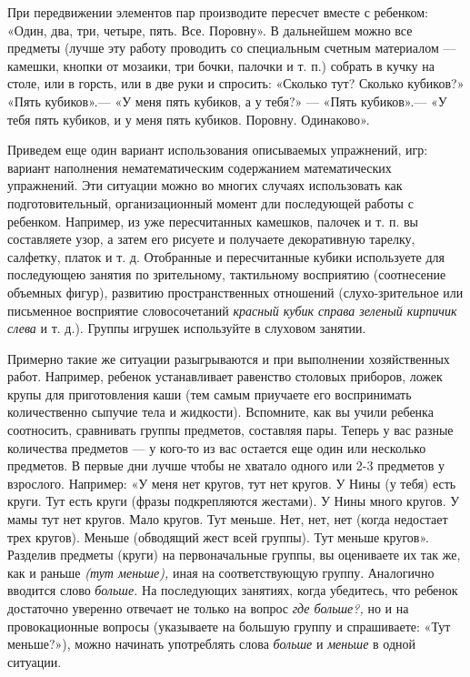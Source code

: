 \documentclass{book}
\renewcommand{\emph}[1]{\textit{#1}}
\begin{document}
При передвижении элементов пар производите пересчет вместе с ребенком:
«Один, два, три, четыре, пять. Все. Поровну». В дальнейшем можно все
предметы (лучше эту работу проводить со специальным счетным материалом
--- камешки, кнопки от мозаики, три бочки, палочки и т. п.) собрать в
кучку на столе, или в горсть, или в две руки и спросить: «Сколько тут?
Сколько кубиков?» «Пять кубиков».--- «У меня пять кубиков, а у тебя?»
--- «Пять кубиков».--- «У тебя пять кубиков, и у меня пять кубиков.
Поровну. Одинаково».

Приведем еще один вариант использования описываемых упражнений, игр:
вариант наполнения нематематическим содержанием математических
упражнений. Эти ситуации можно во многих случаях использовать как
подготовительный, организационный момент дли последующей работы с
ребенком. Например, из уже пересчитанных камешков, палочек и т. п. вы
составляете узор, а затем его рисуете и получаете декоративную тарелку,
салфетку, платок и т. д. Отобранные и пересчитанные кубики используете
для последующею занятия по зрительному, тактильному восприятию
(соотнесение объемных фигур), развитию пространственных отношений
(слухо-зрительное или письменное восприятие словосочетаний \emph{красный
кубик справа зеленый кирпичик слева} и т. д.). Группы игрушек
используйте в слуховом занятии.

Примерно такие же ситуации разыгрываются и при выполнении хозяйственных
работ. Например, ребенок устанавливает равенство столовых приборов,
ложек крупы для приготовления каши (тем самым приучаете его воспринимать
количественно сыпучие тела и жидкости). Вспомните, как вы учили ребенка
соотносить, сравнивать группы предметов, составляя пары. Теперь у вас
разные количества предметов --- у кого-то из вас остается еще один или
несколько предметов. В первые дни лучше чтобы не хватало одного или 2-3
предметов у взрослого. Например: «У меня нет кругов, тут нет кругов. У
Нины (у тебя) есть круги. Тут есть круги (фразы подкрепляются жестами).
У Нины много кругов. У мамы тут нет кругов. Мало кругов. Тут меньше.
Нет, нет, нет (когда недостает трех кругов). Меньше (обводящий жест всей
группы). Тут меньше кругов». Разделив предметы (круги) на первоначальные
группы, вы оцениваете их так же, как и раньше \emph{(тут меньше),} иная
на соответствующую группу. Аналогично вводится слово \emph{больше.} На
последующих занятиях, когда убедитесь, что ребенок достаточно уверенно
отвечает не только на вопрос \emph{где больше?,} но и на провокационные
вопросы (указываете на большую группу и спрашиваете: «Тут меньше?»),
можно начинать употреблять слова \emph{больше} и \emph{меньше} в одной
ситуации.
\end{document}
